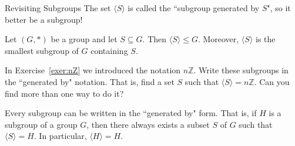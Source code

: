 \begin{section}{Revisiting Subgroups}
The set $\langle S\rangle$ is called the ``subgroup generated by $S$", so it better be a subgroup!

\begin{theorem}\label{thm:smallest_subgroup_containing_S}
Let $(G,*)$ be a group and let $S\subseteq G$.  Then $\langle S\rangle \leq G$.  Moreover, $\langle S\rangle$ is the smallest subgroup of $G$ containing $S$.
\end{theorem}

\begin{exercise}
In Exercise~\ref{exer:nZ} we introduced the notation $n\mathbb{Z}$.  Write these subgroups in the ``generated by" notation.  That is, find a set $S$ such that $\langle S\rangle =n\mathbb{Z}$.  Can you find more than one way to do it?
\end{exercise}

Every subgroup can be written in the ``generated by" form.  That is, if $H$ is a subgroup of a group $G$, then there always exists a subset $S$ of $G$ such that $\langle S\rangle=H$.  In particular, $\langle H\rangle=H$.


\end{section}
